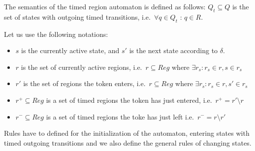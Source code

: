 			
			The semantics of the timed region automaton is defined as follows:
			$Q_t \subseteq Q$ is the set of states with outgoing timed transitions, 
			i.e.~$\forall q \in Q_t$ : $ q \in R $. 
			
			
			Let us use the following notations: 
			
			\begin{itemize}
				\item $s$ is the currently active state, and $s'$ is the next state according to $\delta$.		
				\item $r$ is the set of currently active regions, i.e.~$r \subseteq \mathit{Reg}$ where $\exists r_s : r_s \in r, s \in r_s $ 
				\item $r'$ is the set of regions the token enters, i.e.~$r \subseteq \mathit{Reg}$ where $\exists r_s :  r_s \in r, s' \in r_s $ 
				\item $r^+ \subseteq \mathit{Reg}$ is a set of timed regions the token has just entered, i.e.~$r^+ = r' \setminus r$ 
				\item $r^- \subseteq \mathit{Reg}$ is a set of timed regions the toke has just left i.e.~$r^- = r \setminus r'$
			\end{itemize}
			
			Rules  have to defined for the initialization of the automaton, entering states with timed outgoing transitions and we also define the general rules of changing states. 
			

